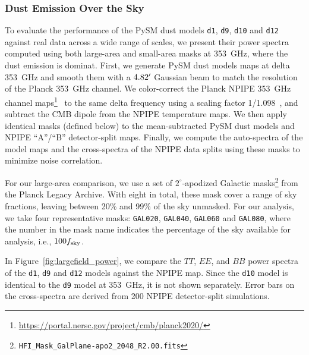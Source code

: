 \documentclass[twocolumn]{aastex631}
\begin{document}
\subsubsection{Dust Emission Over the Sky} 
\label{sec:dust_validation}
To evaluate the performance of the PySM dust models \texttt{d1}, \texttt{d9}, \texttt{d10} and \texttt{d12} against real data across a wide range of scales, we present their power spectra computed using both large-area and small-area masks at 353~GHz, where the dust emission is dominat. First, we generate PySM dust models maps at delta 353~GHz and smooth them with a $4.82\mbox{$^\prime$}$ Gaussian beam to match the resolution of the Planck 353~GHz channel. We color-correct the Planck NPIPE 353~GHz channel maps\footnote{\url{https://portal.nersc.gov/project/cmb/planck2020/}}~\citep{PlanckCollaboration:2020} to the same delta frequency using a scaling factor 1/1.098~\citep{planck2016-l11A}, and subtract the CMB dipole from the NPIPE temperature maps. We then apply identical masks (defined below) to the mean-subtracted PySM dust models and NPIPE ``A''/``B'' detector-split maps. Finally, we compute the auto-spectra of the model maps and the cross-spectra of the NPIPE data splits using these masks to minimize noise correlation. 

For our large-area comparison, we use a set of $2^\circ$-apodized Galactic masks\footnote{\texttt{HFI\_Mask\_GalPlane-apo2\_2048\_R2.00.fits}} from the Planck Legacy Archive. With eight in total, these mask cover a range of sky fractions, leaving between 20\% and 99\% of the sky unmasked. For our analysis, we take four representative masks: \texttt{GAL020}, \texttt{GAL040}, \texttt{GAL060} and \texttt{GAL080}, where the number in the mask name indicates the percentage of the sky available for analysis, i.e., $100 f_{\rm sky}$.

In Figure~\ref{fig:largefield_power}, we compare the $TT$, $EE$, and $BB$ power spectra of the \texttt{d1}, \texttt{d9} and \texttt{d12} models against the NPIPE map. Since the \texttt{d10} model is identical to the \texttt{d9} model at 353~GHz, it is not shown separately. Error bars on the cross-spectra are derived from 200 NPIPE detector-split simulations.
\end{document}
